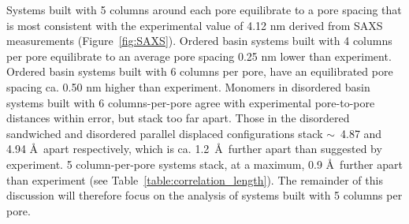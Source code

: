 \documentclass[journal=jpcbfk,manuscript=article]{achemso}
\begin{document}
  Systems built with 5 columns around each pore equilibrate to a pore spacing that
  is most consistent with the experimental value of 4.12 nm derived from SAXS
  measurements (Figure~\ref{fig:SAXS}). Ordered basin systems built with 4
  columns per pore equilibrate to an average pore spacing 0.25 nm lower than
  experiment. Ordered basin systems built with 6 columns per pore, have an
  equilibrated pore spacing ca. 0.50 nm higher than experiment.  Monomers in
  disordered basin systems built with 6 columns-per-pore agree with experimental
  pore-to-pore distances within error, but stack too far apart. 
Those in the
  disordered sandwiched and disordered parallel displaced configurations stack
  $\sim$~4.87 and 4.94 \AA~apart respectively, which is ca. 1.2~\AA~further apart
  than suggested by experiment. 5 column-per-pore systems stack, at a maximum,
  0.9 \AA~further apart than experiment (see 
  Table~\ref{table:correlation_length}).  The remainder of this discussion will therefore 
  focus on the analysis of systems built with 5 columns per pore. 


  
\end{document}
